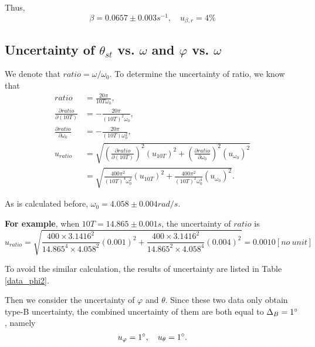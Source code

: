     Thus, 
    \[
        \beta=0.0657\pm 0.003s^{-1}, \quad u_{\beta,r}=4\%
    \]

\subsection{Uncertainty of $\theta_{st}$ vs. $\omega$ and $\varphi$ vs. $\omega$}
    We denote that $ratio=\omega/\omega_0$. To determine the uncertainty of ratio, we know that
    \[
    \begin{split}
        ratio&=\frac{20\pi}{10T\omega_0},\\
        \frac{\partial ratio}{\partial (10T)}&=-\frac{20\pi}{(10T)^2\omega_0},\\
        \frac{\partial ratio}{\partial \omega_0}&=-\frac{20\pi}{(10T)\omega_0^2},\\
        u_{ratio}&=\sqrt{(\frac{\partial ratio}{\partial (10T)})^2(u_{10T})^2+(\frac{\partial ratio}{\partial \omega_0})^2(u_{\omega_0})^2}\\
        &=\sqrt{\frac{400\pi^2}{(10T)^4\omega_0^2}(u_{10T})^2+\frac{400\pi^2}{(10T)^2\omega_0^4}(u_{\omega_0})^2}.
    \end{split}
    \]

    As is calculated before, $\omega_0=4.058\pm 0.004rad/s$.

    \textbf{For example}, when $10T=14.865\pm 0.001s$, the uncertainty of $ratio$ is
    \[
        u_{ratio}=\sqrt{\frac{400\times3.1416^2}{14.865^4\times4.058^2}(0.001)^2+\frac{400\times3.1416^2}{14.865^2\times4.058^4}(0.004)^2}=0.0010[no\ unit]
    \]

    To avoid the similar calculation, the results of uncertainty are listed in Table \ref{data_phi2}.

    Then we consider the uncertainty of $\varphi$ and $\theta$. Since these two data only obtain type-B uncertainty, the combined uncertainty of them are both equal to $\Delta_B=1^\circ$, namely
    \[
        u_{\varphi}=1^\circ, \quad u_{\theta}=1^\circ.
    \]